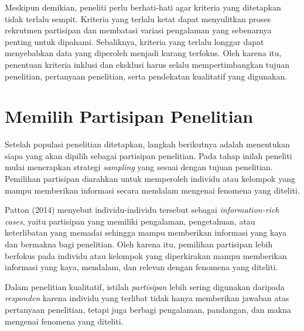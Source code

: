 \documentclass[
  indonesian,
  letterpaper,
  DIV=11,
  numbers=noendperiod]{scrreprt}
\begin{document}
Meskipun demikian, peneliti perlu berhati-hati agar kriteria yang
ditetapkan tidak terlalu sempit. Kriteria yang terlalu ketat dapat
menyulitkan proses rekrutmen partisipan dan membatasi variasi pengalaman
yang sebenarnya penting untuk dipahami. Sebaliknya, kriteria yang
terlalu longgar dapat menyebabkan data yang diperoleh menjadi kurang
terfokus. Oleh karena itu, penentuan kriteria inklusi dan eksklusi harus
selalu mempertimbangkan tujuan penelitian, pertanyaan penelitian, serta
pendekatan kualitatif yang digunakan.

\section{Memilih Partisipan
Penelitian}\label{memilih-partisipan-penelitian}

Setelah populasi penelitian ditetapkan, langkah berikutnya adalah
menentukan siapa yang akan dipilih sebagai partisipan penelitian. Pada
tahap inilah peneliti mulai menerapkan strategi \emph{sampling} yang
sesuai dengan tujuan penelitian. Pemilihan partisipan diarahkan untuk
memperoleh individu atau kelompok yang mampu memberikan informasi secara
mendalam mengenai fenomena yang diteliti.

Patton (2014) menyebut individu-individu tersebut sebagai
\emph{information-rich cases}, yaitu partisipan yang memiliki
pengalaman, pengetahuan, atau keterlibatan yang memadai sehingga mampu
memberikan informasi yang kaya dan bermakna bagi penelitian. Oleh karena
itu, pemilihan partisipan lebih berfokus pada individu atau kelompok
yang diperkirakan mampu memberikan informasi yang kaya, mendalam, dan
relevan dengan fenomena yang diteliti.

\begin{tcolorbox}[enhanced jigsaw, colframe=quarto-callout-note-color-frame, toptitle=1mm, breakable, leftrule=.75mm, arc=.35mm, toprule=.15mm, colback=white, colbacktitle=quarto-callout-note-color!10!white, bottomtitle=1mm, bottomrule=.15mm, titlerule=0mm, title=\textcolor{quarto-callout-note-color}{\faInfo}\hspace{0.5em}{Partisipan atau Responden?}, coltitle=black, left=2mm, opacitybacktitle=0.6, opacityback=0, rightrule=.15mm]

Dalam penelitian kualitatif, istilah \emph{partisipan} lebih sering
digunakan daripada \emph{responden} karena individu yang terlibat tidak
hanya memberikan jawaban atas pertanyaan penelitian, tetapi juga berbagi
pengalaman, pandangan, dan makna mengenai fenomena yang diteliti.

\end{tcolorbox}
\end{document}
